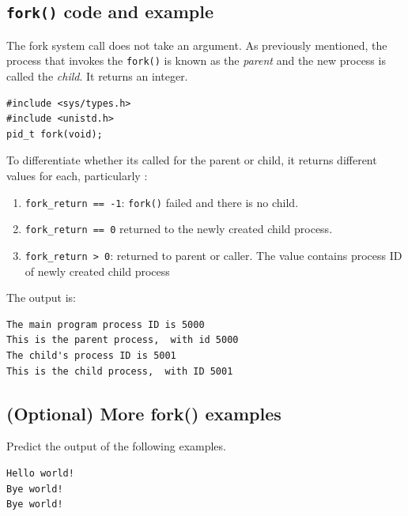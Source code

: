 \documentclass[a4paper]{article}
\begin{document}
\subsection{\texttt{fork()} code and example}
The fork system call does not take an argument. As previously mentioned, the process that invokes the \texttt{fork()} is known as the \textit{parent} and the new process is called the \textit{child}. It returns an integer.
\begin{verbatim}
#include <sys/types.h>
#include <unistd.h>
pid_t fork(void);
\end{verbatim}
To differentiate whether its called for the parent or child, it returns different values for each, particularly \cite{webg4gfork}:
\begin{enumerate}
    \item \texttt{fork\_return == -1}: \texttt{fork()} failed and there is no child.
    \item \texttt{fork\_return == 0} returned to the newly created child process.
    \item \texttt{fork\_return > 0}: returned to parent or caller. The value contains process ID of newly created child process
\end{enumerate}

The output is:
\begin{verbatim}
The main program process ID is 5000
This is the parent process,  with id 5000
The child's process ID is 5001
This is the child process,  with ID 5001
\end{verbatim}

\subsection{(Optional) More fork() examples}

Predict the output of the following examples.
\begin{exmp}
\textup{

}
\end{exmp}
\begin{verbatim}
Hello world!
Bye world!
Bye world!
\end{verbatim}
\end{document}
